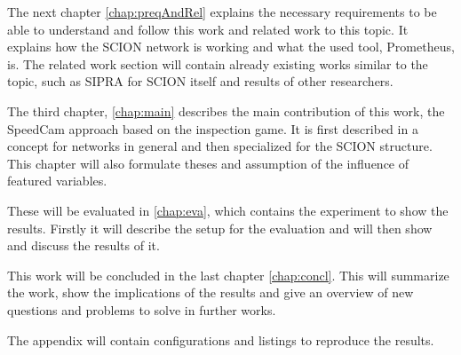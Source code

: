 \documentclass[thesis.tex]{subfiles}
\begin{document}
The next chapter \autoref{chap:preqAndRel} explains the necessary requirements to be able to understand and follow this work and related work to this topic. It explains how the SCION network is working and what the used tool, Prometheus, is. The related work section will contain already existing works similar to the topic, such as SIPRA for SCION itself and results of other researchers. 

The third chapter, \autoref{chap:main} describes the main contribution of this work, the SpeedCam approach based on the inspection game. It is first described in a concept for networks in general and then specialized for the SCION structure. This chapter will also formulate theses and assumption of the influence of featured variables.

These will be evaluated in \autoref{chap:eva}, which contains the experiment to show the results. Firstly it will describe the setup for the evaluation and will then show and discuss the results of it.

This work will be concluded in the last chapter \autoref{chap:concl}. This will summarize the work, show the implications of the results and give an overview of new questions and problems to solve in further works.

The appendix will contain configurations and listings to reproduce the results.

\subfilebib %
\end{document}
